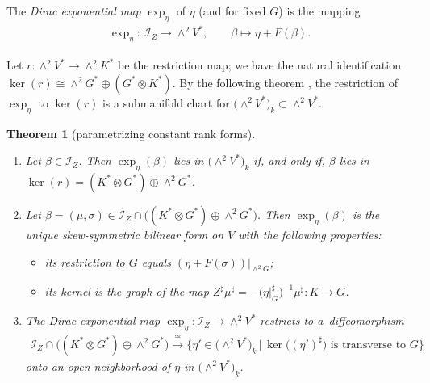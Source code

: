 \documentclass[10pt,a4paper]{amsart}
\numberwithin{equation}{section}
\newtheorem{Theorem}{Theorem}[section]
\begin{document}
\begin{Definition}\label{definition: Dirac exponential map}The \emph{Dirac exponential map} $\exp_{\eta}$ of $\eta$ (and for fixed $G$) is the mapping
\begin{gather*}{\exp_{\eta}}\colon \ \mathcal{I}_Z \to \wedge^2 V^*, \qquad \beta \mapsto \eta + F(\beta).\end{gather*}
\end{Definition}

Let $ r\colon {\wedge}^2 V^* \to {\wedge}^2 K^*$ be the restriction map; we have the natural identification $\ker(r) \cong \wedge^2 G^* \oplus (G^*\otimes K^*)$. By the following theorem \cite[Theorem~2.6]{SZPre}, the restriction of $\exp_{\eta}$ {to $\ker(r)$} is a submanifold chart for $\big({\wedge}^2 V^*\big)_k \subset \wedge^2 V^*$.


\begin{Theorem}[parametrizing constant rank forms]\label{theorem: almost Dirac structures}\quad
\begin{enumerate}\itemsep=0pt
\item[$(i)$] Let $\beta \in \mathcal{I}_Z$. Then $\exp_{\eta}(\beta)$ lies in $\big({\wedge}^2 V^*\big)_k$ if, and only if, $\beta$ lies in $\ker(r)=(K^*\otimes G^*)\oplus \wedge^2G^*$.

\item[$(ii)$] Let $\beta = (\mu,\sigma) \in \mathcal{I}_Z\cap \big((K^*\otimes G^*)\oplus \wedge^2G^*\big)$. Then $\exp_{\eta}(\beta)$ is the unique skew-symmetric bilinear form on $V$ with the following properties:
\begin{itemize}\itemsep=0pt
\item its restriction to $G$ equals $(\eta+F(\sigma))|_{\wedge^2G}$;
\item its kernel is the graph of the map $Z^\sharp \mu^\sharp= -\big(\eta\vert_G^{\sharp}\big)^{-1}\mu^\sharp\colon K\to G$.
\end{itemize}

\item[$(iii)$]The Dirac exponential map $\exp_{\eta}\colon \mathcal{I}_Z \to \wedge^2 V^*$ restricts to a~diffeomorphism
\begin{gather*}\mathcal{I}_Z \cap \big((K^*\otimes G^*)\oplus \wedge^2G^*\big) \stackrel{\cong}{\longrightarrow}
\big\{\eta' \in \big({\wedge}^2 V^*\big)_k\,|\, \ker\big({(\eta')^{\sharp}}\big) \text{ is transverse to $G$}\big\}\end{gather*}
onto an open neighborhood of $\eta$ in $\big({\wedge}^2 V^*\big)_k$.
\end{enumerate}
\end{Theorem}
\end{document}
